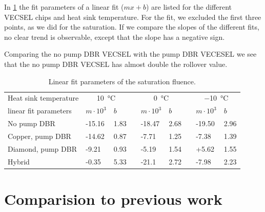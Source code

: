 In \cref{tab:f2} the fit parameters of a linear fit ($mx+b$) are listed for the different VECSEL chips and heat sink temperature. For the fit, we excluded the first three points, as we did for the saturation. If we compare the slopes of the different fits, no clear trend is observable, except that the slope has a negative sign.

Comparing the no pump DBR VECSEL with the pump DBR VECESEL we see that the no pump DBR VECSEL has almost double the rollover value. 

\begin{table}[ht]
    \centering
    \begin{tabular}{lllllllll}
        \hline
        Heat sink temperature & \multicolumn{2}{c}{\qty{10}{\celsius}} &      & \multicolumn{2}{c}{\qty{0}{\celsius}} &              & \multicolumn{2}{c}{\qty{-10}{\celsius}}                          \\ \cline{2-3} \cline{5-6} \cline{8-9}
        linear fit parameters & $m\cdot10^3$                           & $b$  &                                       & $m\cdot10^3$ & $b$                                     &  & $m\cdot10^3$ & $b$  \\ \hline
        No pump DBR           & -15.16                                 & 1.83 &                                       & -18.47       & 2.68                                    &  & -19.50       & 2.96 \\ \hline
        Copper, pump DBR      & -14.62                                 & 0.87 &                                       & -7.71        & 1.25                                    &  & -7.38        & 1.39 \\ \hline
        Diamond, pump DBR     & -9.21                                   & 0.93 &                                       & -5.19         & 1.54                                    &  & +5.62         & 1.55 \\ \hline
        Hybrid                & -0.35                                  & 5.33 &                                       & -21.1       & 2.72                                    &  & -7.98        & 2.23
    \end{tabular}
    \caption{Linear fit parameters of the saturation fluence. }
    \label{tab:f2}
\end{table}
\vspace{-2\baselineskip}

\section{Comparision to previous work}

